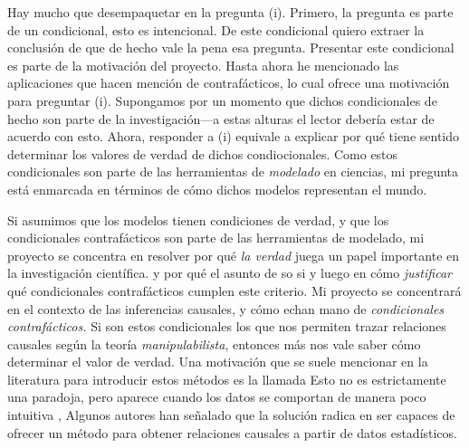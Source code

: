 Hay mucho que desempaquetar en la pregunta (i). Primero, la
pregunta es parte de un condicional, esto es intencional. De
este condicional quiero extraer la conclusión de que de
hecho vale la pena esa pregunta. Presentar este condicional
es parte de la motivación del proyecto. Hasta ahora he
mencionado las aplicaciones que hacen mención de
contrafácticos, lo cual ofrece una motivación para preguntar
(i). Supongamos por un momento que dichos condicionales de
hecho son parte de la investigación---a estas alturas el
lector debería estar de acuerdo con esto. Ahora, responder a
(i) equivale a explicar por qué tiene sentido determinar los
valores de verdad de dichos condiocionales. Como estos
condicionales son parte de las herramientas de
\emph{modelado} en ciencias, mi pregunta está enmarcada en
términos de cómo dichos modelos representan el mundo.

Si asumimos que los modelos tienen condiciones de verdad, y
que los condicionales contrafácticos son parte de las
herramientas de modelado, mi proyecto se concentra en
resolver por qué \emph{la verdad} juega un papel importante
en la investigación científica.  y por qué el asunto de so
si  y luego en cómo \emph{justificar} qué condicionales
contrafácticos cumplen este criterio. Mi proyecto se
concentrará en el contexto de las inferencias causales, y
cómo echan mano de \emph{condicionales contrafácticos.} Si
son estos condicionales los que nos permiten trazar
relaciones causales según la teoría \emph{manipulabilista},
entonces más nos vale saber cómo determinar el valor de
verdad. Una motivación que se suele mencionar en la
literatura para introducir estos métodos es la llamada
 Esto no es estrictamente una
paradoja, pero aparece cuando los datos se comportan de
manera poco intuitiva \parencite[p.~13]{Hajek2016-HAJOHO},
Algunos autores han señalado que la solución radica en ser
capaces de ofrecer un método para obtener relaciones
causales a partir de datos estadísticos.

